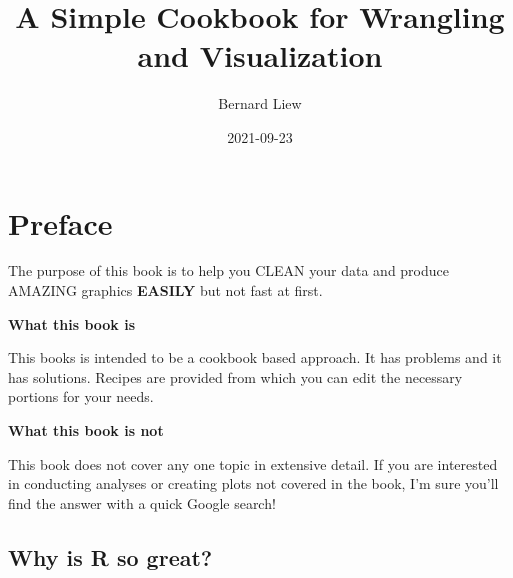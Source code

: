 \documentclass[
]{book}
\title{A Simple Cookbook for Wrangling and Visualization}
\author{Bernard Liew}
\date{2021-09-23}
\begin{document}
\maketitle

{
\setcounter{tocdepth}{1}
\tableofcontents
}
\hypertarget{intro}{%
\chapter{Preface}\label{intro}}

The purpose of this book is to help you CLEAN your data and produce AMAZING graphics \textbf{EASILY} but not fast at first.

\textbf{What this book is}

This books is intended to be a cookbook based approach. It has problems and it has solutions. Recipes are provided from which you can edit the necessary portions for your needs.

\textbf{What this book is not}

This book does not cover any one topic in extensive detail. If you are interested in conducting analyses or creating plots not covered in the book, I'm sure you'll find the answer with a quick Google search!

\hypertarget{why-is-r-so-great}{%
\section{Why is R so great?}\label{why-is-r-so-great}}
\end{document}
